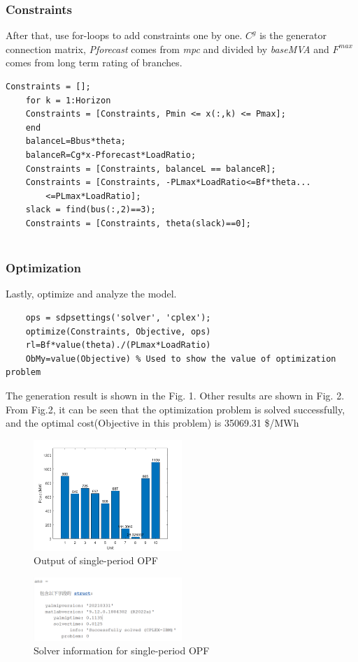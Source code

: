 \documentclass[lettersize,journal]{IEEEtran}
\begin{document}
\subsubsection{Constraints}

After that, use for-loops to add constraints one by one. $C^g$ is the generator connection matrix, \textit{Pforecast} comes from \textit{mpc} and divided by \textit{baseMVA} and $F^{max}$ comes from long term rating of branches.
\begin{lstlisting}[]
	Constraints = [];
	for k = 1:Horizon
	Constraints = [Constraints, Pmin <= x(:,k) <= Pmax];
	end
	balanceL=Bbus*theta;
	balanceR=Cg*x-Pforecast*LoadRatio;
	Constraints = [Constraints, balanceL == balanceR];
	Constraints = [Constraints, -PLmax*LoadRatio<=Bf*theta...
		<=PLmax*LoadRatio];
	slack = find(bus(:,2)==3);
	Constraints = [Constraints, theta(slack)==0];
	
\end{lstlisting}
\subsubsection{Optimization}
Lastly,  optimize and analyze the model.
\begin{lstlisting}
	ops = sdpsettings('solver', 'cplex');
	optimize(Constraints, Objective, ops)
	rl=Bf*value(theta)./(PLmax*LoadRatio)
	ObMy=value(Objective) % Used to show the value of optimization problem
\end{lstlisting}

The generation result is shown in the Fig. 1. Other results are shown in Fig. 2. From Fig.2, it can be seen that the optimization problem is solved successfully, and the optimal cost(Objective in this problem) is 35069.31 \$/MWh
\begin{figure}[htbp]
	\centering
	\includegraphics[width=0.5\textwidth]{t1-gen}
	\caption{Output of single-period OPF
	}
	\label{fig_1}
\end{figure}

\begin{figure}[htbp]
	\centering
	\includegraphics[width=0.5\textwidth]{t1-ans}
	\caption{Solver information for single-period OPF
	}
	\label{fig_2}
\end{figure}
\end{document}
